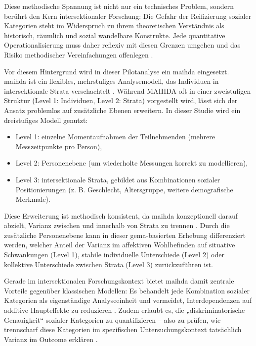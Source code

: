 Diese methodische Spannung ist nicht nur ein technisches Problem, sondern berührt den Kern intersektionaler Forschung: Die Gefahr der Reifizierung sozialer Kategorien steht im Widerspruch zu ihrem theoretischen Verständnis als historisch, räumlich und sozial wandelbare Konstrukte. Jede quantitative Operationalisierung muss daher reflexiv mit diesen Grenzen umgehen und das Risiko methodischer Vereinfachungen offenlegen \parencite{rodo-de-zarateDevelopingGeographiesIntersectionality2014, websterCenteringSocialtechnicalRelations2021}.

Vor diesem Hintergrund wird in dieser Pilotanalyse ein \acrfull{maihda} eingesetzt. \gls{maihda} ist ein flexibles, mehrstufiges Analysemodell, das Individuen in intersektionale Strata verschachtelt \parencite{evansTutorialConductingIntersectional2024}. Während MAIHDA oft in einer zweistufigen Struktur (Level 1: Individuen, Level 2: Strata) vorgestellt wird, lässt sich der Ansatz problemlos auf zusätzliche Ebenen erweitern. In dieser Studie wird ein dreistufiges Modell genutzt:

\begin{itemize}
    \item Level 1: einzelne Momentaufnahmen der Teilnehmenden (mehrere Messzeitpunkte pro Person),
    \item Level 2: Personenebene (um wiederholte Messungen korrekt zu modellieren),
    \item Level 3: intersektionale Strata, gebildet aus Kombinationen sozialer Positionierungen (z. B. Geschlecht, Altersgruppe, weitere demografische Merkmale).
\end{itemize}

Diese Erweiterung ist methodisch konsistent, da \gls{maihda} konzeptionell darauf abzielt, Varianz zwischen und innerhalb von Strata zu trennen \parencite{grossModellingIntersectionalityWithin2023}. Durch die zusätzliche Personenebene kann in dieser \gls{gema}-basierten Erhebung differenziert werden, welcher Anteil der Varianz im affektiven Wohlbefinden auf situative Schwankungen (Level 1), stabile individuelle Unterschiede (Level 2) oder kollektive Unterschiede zwischen Strata (Level 3) zurückzuführen ist.

Gerade im intersektionalen Forschungskontext bietet \gls{maihda} damit zentrale Vorteile gegenüber klassischen Modellen: Es behandelt jede Kombination sozialer Kategorien als eigenständige Analyseeinheit und vermeidet, Interdependenzen auf additive Haupteffekte zu reduzieren \parencite{hancockWhenMultiplicationDoesnt2007, bowlegInvitedReflectionQuantifying2016}. Zudem erlaubt es, die „diskriminatorische Genauigkeit“ sozialer Kategorien zu quantifizieren -- also zu prüfen, wie trennscharf diese Kategorien im spezifischen Untersuchungskontext tatsächlich Varianz im Outcome erklären \parencite{evansTutorialConductingIntersectional2024}.

